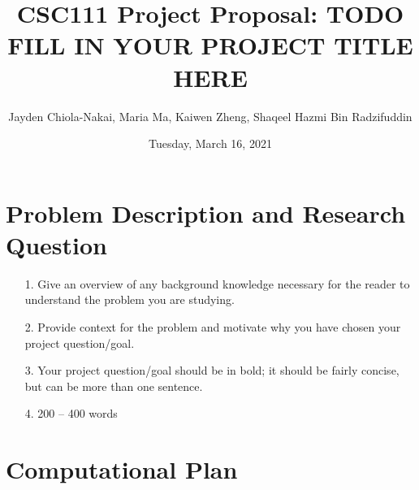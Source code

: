 \documentclass[fontsize=11pt]{article}
\title{CSC111 Project Proposal: TODO FILL IN YOUR PROJECT TITLE HERE}
\author{Jayden Chiola-Nakai, Maria Ma, Kaiwen Zheng, Shaqeel Hazmi Bin Radzifuddin}
\date{Tuesday, March 16, 2021}
\begin{document}
\maketitle

\section*{Problem Description and Research Question}

\begin{enumerate}
    \item[1.]
    Give an overview of any background knowledge necessary for the reader to understand the problem you are studying.
    \item[2.]
    Provide context for the problem and motivate why you have chosen your project question/goal.
    \item[3.]
    Your project question/goal should be in bold; it should be fairly concise, but can be more than one sentence.
    \item[4.]
    200 – 400 words
\end{enumerate}

\section*{Computational Plan}
\end{document}
